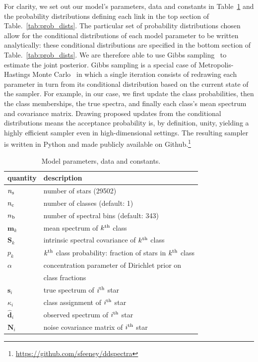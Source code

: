 \documentclass[a4paper,fleqn,usenatbib]{mnras}
\newcommand{\nb}{n_{\rm b}}
\newcommand{\nc}{n_{\rm c}}
\newcommand{\ns}{n_{\rm s}}
\newcommand{\specmean}{{\bm m}}
\newcommand{\speccov}{{\bm S}}
\newcommand{\classprob}{{p}}
\newcommand{\objspec}{{\bm s}}
\newcommand{\objclass}{{\kappa}}
\newcommand{\objdata}{\hat{\bm d}}
\newcommand{\objnoise}{{\bm N}}
\begin{document}
For clarity, we set out our model's parameters, data and constants in Table~\ref{tab:params} and the probability distributions defining each link in the top section of Table.~\ref{tab:prob_dists}. The particular set of probability distributions chosen allow for the conditional distributions of each model parameter to be written analytically: these conditional distributions are specified in the bottom section of Table.~\ref{tab:prob_dists}. We are therefore able to use Gibbs sampling~\citep{Geman_and_Geman:1984} to estimate the joint posterior. Gibbs sampling is a special case of Metropolis-Hastings Monte Carlo~\citep{Hastings:1970} in which a single iteration consists of redrawing each parameter in turn from its conditional distribution based on the current state of the sampler. For example, in our case, we first update the class probabilities, then the class memberships, the true spectra, and finally each class's mean spectrum and covariance matrix. Drawing proposed updates from the conditional distributions means the acceptance probability is, by definition, unity, yielding a highly efficient sampler even in  high-dimensional settings. The resulting sampler is written in Python and made publicly available on Github.\footnote{\href{https://github.com/sfeeney/ddspectra}{https://github.com/sfeeney/ddspectra}}

\begin{table}
    \centering
    \caption{Model parameters, data and constants.}
    \label{tab:params}
    \begin{tabular}{ll}
        \hline
        quantity & description \\
        \hline
        $\ns$ & number of stars (29502) \\
        $\nc$ & number of classes (default: 1) \\
        $\nb$ & number of spectral bins (default: 343) \\
        $\specmean_k$ & mean spectrum of $k^{\rm th}$ class \\
        $\speccov_k$ & intrinsic spectral covariance of $k^{\rm th}$ class \\
        $\classprob_k$ & $k^{\rm th}$ class probability: fraction of stars in $k^{\rm th}$ class \\
        $\alpha$ & concentration parameter of Dirichlet prior on \\
         & class fractions \\
        $\objspec_i$ & true spectrum of $i^{\rm th}$ star \\
        $\objclass_i$ & class assignment of $i^{\rm th}$ star \\
        $\objdata_i$ & observed spectrum of $i^{\rm th}$ star \\
        $\objnoise_i$ & noise covariance matrix of $i^{\rm th}$ star \\
        \hline
    \end{tabular}
\end{table}
\end{document}
